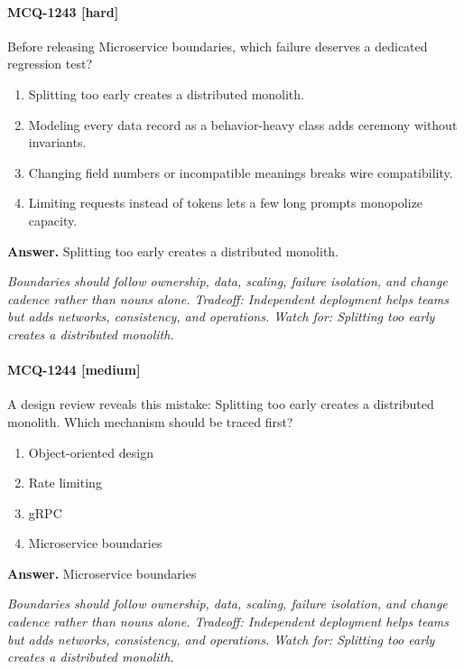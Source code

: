 \paragraph{MCQ-1243 [hard]} Before releasing Microservice boundaries, which failure deserves a dedicated regression test?
\begin{enumerate}[label=\Alph*.]
\item Splitting too early creates a distributed monolith.
\item Modeling every data record as a behavior-heavy class adds ceremony without invariants.
\item Changing field numbers or incompatible meanings breaks wire compatibility.
\item Limiting requests instead of tokens lets a few long prompts monopolize capacity.
\end{enumerate}
\noindent\textbf{Answer.} Splitting too early creates a distributed monolith.
\par\textit{Boundaries should follow ownership, data, scaling, failure isolation, and change cadence rather than nouns alone. Tradeoff: Independent deployment helps teams but adds networks, consistency, and operations. Watch for: Splitting too early creates a distributed monolith.}
\paragraph{MCQ-1244 [medium]} A design review reveals this mistake: Splitting too early creates a distributed monolith. Which mechanism should be traced first?
\begin{enumerate}[label=\Alph*.]
\item Object-oriented design
\item Rate limiting
\item gRPC
\item Microservice boundaries
\end{enumerate}
\noindent\textbf{Answer.} Microservice boundaries
\par\textit{Boundaries should follow ownership, data, scaling, failure isolation, and change cadence rather than nouns alone. Tradeoff: Independent deployment helps teams but adds networks, consistency, and operations. Watch for: Splitting too early creates a distributed monolith.}
